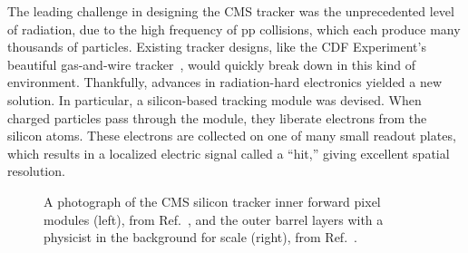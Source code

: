 The leading challenge in designing the CMS tracker was the unprecedented level of radiation, due to the high frequency of pp collisions, which each produce many thousands of particles. 
Existing tracker designs, like the CDF Experiment's beautiful gas-and-wire tracker~\cite{CDF:2003xbh}, would quickly break down\footnotemark{} in this kind of environment. 
Thankfully, advances in radiation-hard electronics yielded a new solution. 
In particular, a silicon-based tracking module was devised. 
When charged particles pass through the module, they liberate electrons from the silicon atoms. 
These electrons are collected on one of many small readout plates, which results in a localized electric signal called a ``hit,'' giving excellent spatial resolution. 

\begin{figure}[htb]
    \centering
    \quad
    \caption[A photograph of the CMS silicon tracker inner forward pixel modules and the outer barrel layers with a physicist in the background for scale.]{
        A photograph of the CMS silicon tracker inner forward pixel modules (left), from Ref.~\cite{Hoch:2017264}, and the outer barrel layers with a physicist in the background for scale (right), from Ref.~\cite{Maximilien:995912}. 
    }
    \label{fig:cms_tracker_pictures}
\end{figure}

